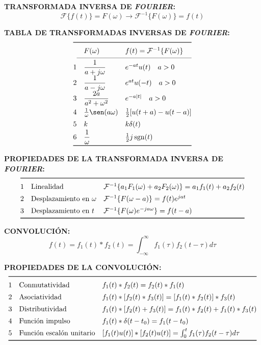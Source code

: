 \documentclass[letter,twoside,8pt]{article}
\DeclareMathOperator{\sgn}{sgn}
\begin{document}
\textbf{TRANSFORMADA INVERSA DE \emph{FOURIER}:}
\begin{equation*}
    \mathcal{F}\{f(t)\}=F(\omega)\rightarrow\mathcal{F}^{-1}\{F(\omega)\}=f(t)
\end{equation*}

\textbf{TABLA DE TRANSFORMADAS INVERSAS DE \emph{FOURIER}:}
\begin{equation*}
\def\arraystretch{1.4}
\begin{array}{@{}cll@{}}
\toprule
 & F(\omega) & f(t)=\mathcal{F}^{-1}\{F(\omega)\}\\
\cmidrule(l){1-3}
 1 & \dfrac{1}{a+j\omega}
   & e^{-at}u(t)\quad{a}>0\\
 2 & \dfrac{1}{a-j\omega}
   & e^{at}u(-t)\quad{a}>0\\
 3 & \dfrac{2a}{a^2+\omega^2}
   & e^{-a|t|}\quad{a}>0\\
 4 & \frac{1}{\omega}\sen(a\omega)
   & \frac{1}{2}[u(t+a)-u(t-a)]\\
 5 & k
   & k\delta(t)\\
 6 & \dfrac{1}{\omega}
   & \frac{1}{2}j\sgn(t)\\
\bottomrule
\end{array}
\end{equation*}

\textbf{PROPIEDADES DE LA TRANSFORMADA INVERSA DE \emph{FOURIER}:}
\begin{equation*}
\def\arraystretch{1.4}
\begin{array}{@{}cll@{}}
\toprule
 1 & \text{Linealidad}
   & \mathcal{F}^{-1}\{a_1F_1(\omega)+a_2F_2(\omega)\}=a_1f_1(t)+a_2f_2(t)\\
 2 & \text{Desplazamiento en }\omega
   & \mathcal{F}^{-1}\{F(\omega-a)\}=f(t)e^{jat}\\
 3 & \text{Desplazamiento en }t
   & \mathcal{F}^{-1}\{F(\omega)e^{-ja\omega}\}=f(t-a)\\
\bottomrule
\end{array}
\end{equation*}

\textbf{CONVOLUCIÓN:}
\begin{equation*}
    f(t)=f_1(t)*f_2(t)=\int_{-\infty}^{\infty}f_1(\tau)f_2(t-\tau){d\tau}
\end{equation*}

\textbf{PROPIEDADES DE LA CONVOLUCIÓN:}
\begin{equation*}
\def\arraystretch{1.4}
\begin{array}{@{}cll@{}}
\toprule
 1 & \text{Conmutatividad}
   & f_1(t)*f_2(t)=f_2(t)*f_1(t)\\
 2 & \text{Asociatividad}
   & f_1(t)*[f_2(t)*f_3(t)]=[f_1(t)*f_2(t)]*f_3(t)\\
 3 & \text{Distributividad}
   & f_1(t)*[f_2(t)+f_3(t)]=f_1(t)*f_2(t)+f_1(t)*f_3(t)\\
 4 & \text{Función impulso}
   & f_1(t)*\delta(t-t_0)=f_1(t-t_0)\\
 5 & \text{Función escalón unitario}
   & [f_1(t)u(t)]*[f_2(t)u(t)]=\int_0^{t}f_1(\tau)f_2(t-\tau){d\tau}\\
\bottomrule
\end{array}
\end{equation*}
\end{document}
